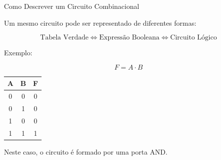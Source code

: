 
\begin{frame}{Como Descrever um Circuito Combinacional}

    Um mesmo circuito pode ser representado de diferentes formas:

    \[
        \boxed{\text{Tabela Verdade}}
        \Longleftrightarrow
        \boxed{\text{Expressão Booleana}}
        \Longleftrightarrow
        \boxed{\text{Circuito Lógico}}
    \]

    \vspace{0.5cm}

    Exemplo:

    \[
        F=A\cdot B
    \]

    \begin{center}
        \begin{tabular}{c c | c}
            \hline
            A & B & F \\
            \hline
            0 & 0 & 0 \\
            0 & 1 & 0 \\
            1 & 0 & 0 \\
            1 & 1 & 1 \\
            \hline
        \end{tabular}
    \end{center}

    Neste caso, o circuito é formado por uma porta AND.

\end{frame}
